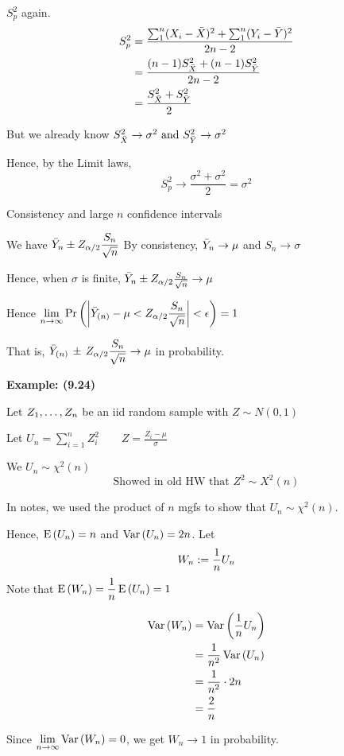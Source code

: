 \example $S_p^2$ again.
\begin{align}
    S^2_p &= \frac{\sum_1^n (X_i - \bar{X})^2 + \sum_1^n(Y_i - \bar{Y})^2}{2n-2} \notag\\
    &=  \frac{(n-1)S_{\bar{X}}^2 + (n-1)S_{\bar{Y}}^2}{2n-2}\notag\\
    &= \frac{S^2_{\bar{X}} + S^2_{\bar{Y}}}{2}\notag
\end{align}

\nl But we already know $S_{\bar{X}}^2 \to \sigma^2 \text{ and } S^2_{\bar{Y}} \to \sigma^2$

\nl Hence, by the Limit laws,
$$S_p^2 \to \frac{\sigma^2 + \sigma^2}{2} = \sigma^2$$

\disc Consistency and large $n$ confidence intervals

\nl We have $\bar{Y}_n \pm Z_{\alpha/2} \dfrac{S_n}{\sqrt{n}}$
By consistency, $\bar{Y}_n \to \mu$ and $S_n \to \sigma$

\nl Hence, when $\sigma$ is finite, $\bar{Y}_n \pm Z_{\alpha/2}\frac{S_n}{\sqrt{n}} \to \mu$

\nl Hence $\displaystyle \limn \Pr\pars{\abs{\Ybar_{(n)} - \mu < Z_{\alpha/2}\frac{S_n}{\sqrt{n}}} < \epsilon } = 1$

\nl That is, $\bar{Y}_{(n)} \,\pm\, Z_{\alpha/2} \dfrac{S_n}{\sqrt{n}} \to\mu $ in probability.

\nl {}

\newpage \noindent \textbf{Example: (9.24)}

\nl Let ${Z}_1, \dots, {Z}_n$ be an iid random sample with $Z \sim N(0,1)$

\nl Let $\displaystyle U_n = \sum_{i=1}^n Z_i^2 \qquad Z = \frac{Z_i - \mu}{\sigma}$

\nl We  $U_n \sim \chi^2(n)$
$$\text{Showed in old HW that } Z^2 \sim X^2(n)$$

\nl In notes, we used the product of $n$ mgfs to show that $U_n \sim \chi^2(n).$

\nl Hence, $\E{U_n} = n$ and $\Var{U_n} = 2n$. Let
$$W_n := \over{n} U_n$$
Note that $\displaystyle \E{W_n} = \over{n}\E{U_n} = 1$

\nl {}
\begin{align*}
\Var{W_n} &= \Var{\over{n} U_n} \\
&= \over{n^2} \Var{U_n} \\
&= \over{n^2} \cdot 2n \\
&= \frac{2}{n}
\end{align*}

\nl Since $\displaystyle \limn \Var{W_n} = 0$, we get $W_n \to 1$ in probability.